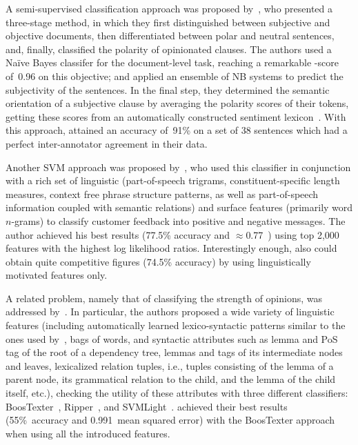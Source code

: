 
A semi-supervised classification approach was proposed
by~\citet{Yu:03}, who presented a three-stage method, in which they
first distinguished between subjective and objective documents, then
differentiated between polar and neutral sentences, and, finally,
classified the polarity of opinionated clauses.  The authors used a
Na{\"i}ve Bayes classifer for the document-level task, reaching a
remarkable \F-score of~0.96 on this objective; and applied an ensemble
of NB systems to predict the subjectivity of the sentences.  In the
final step, they determined the semantic orientation of a subjective
clause by averaging the polarity scores of their tokens, getting these
scores from an automatically constructed sentiment
lexicon~\cite{Hatzivassi:97}.  With this approach, \citeauthor{Yu:03}
attained an accuracy of~91\% on a set of 38 sentences which had a
perfect inter-annotator agreement in their data.


Another SVM approach was proposed by~\citet{Gamon:04}, who used this
classifier in conjunction with a rich set of linguistic
(part-of-speech trigrams, constituent-specific length measures,
context free phrase structure patterns, as well as part-of-speech
information coupled with semantic relations) and surface features
(primarily word $n$-grams) to classify customer feedback into positive
and negative messages.  The author achieved his best results (77.5\%
accuracy and $\approx$0.77~\F) using top 2,000 features with the
highest log likelihood ratios.  Interestingly enough,
\citeauthor{Gamon:04} also could obtain quite competitive figures
(74.5\% accuracy) by using linguistically motivated features only.


A related problem, namely that of classifying the strength of
opinions, was addressed by~\citet{Wilson:04,Wilson:06}.  In
particular, the authors proposed a wide variety of linguistic features
(including automatically learned lexico-syntactic patterns similar to
the ones used by~\citet{Riloff:03}, bags of words, and syntactic
attributes such as lemma and PoS tag of the root of a dependency tree,
lemmas and tags of its intermediate nodes and leaves, lexicalized
relation tuples, i.e., tuples consisting of the lemma of a parent
node, its grammatical relation to the child, and the lemma of the
child itself, etc.), checking the utility of these attributes with
three different classifiers: BoosTexter~\cite{Schapire:00},
Ripper~\cite{Cohen:95}, and SVMLight~\cite{Joachims:99}.
\citet{Wilson:04} achieved their best results (55\%~accuracy and
0.991~mean squared error) with the BoosTexter approach when using all
the introduced features.

